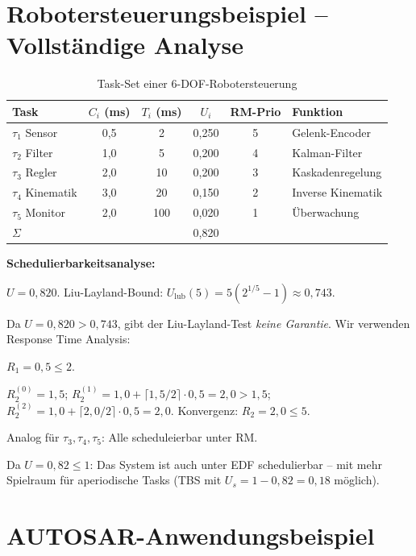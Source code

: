 ﻿\documentclass[a4paper,12pt]{report}
\theoremstyle{definition}
\begin{document}
\section{Robotersteuerungsbeispiel -- Vollständige Analyse}

\begin{table}[H]
	\centering
	\caption{Task-Set einer 6-DOF-Robotersteuerung}
	\begin{tabular}{lccccl}
		\toprule
		Task & $C_i$ (ms) & $T_i$ (ms) & $U_i$ & RM-Prio & Funktion \\
		\midrule
		$\tau_1$ Sensor     & 0{,}5  & 2    & 0{,}250 & 5 & Gelenk-Encoder \\
		$\tau_2$ Filter     & 1{,}0  & 5    & 0{,}200 & 4 & Kalman-Filter \\
		$\tau_3$ Regler     & 2{,}0  & 10   & 0{,}200 & 3 & Kaskadenregelung \\
		$\tau_4$ Kinematik  & 3{,}0  & 20   & 0{,}150 & 2 & Inverse Kinematik \\
		$\tau_5$ Monitor    & 2{,}0  & 100  & 0{,}020 & 1 & Überwachung \\
		\midrule
		$\Sigma$ & & & 0{,}820 & & \\
		\bottomrule
	\end{tabular}
\end{table}

\textbf{Schedulierbarkeitsanalyse:}

$U = 0{,}820$. Liu-Layland-Bound: $U_{\text{lub}}(5) = 5(2^{1/5}-1) \approx 0{,}743$.

Da $U = 0{,}820 > 0{,}743$, gibt der Liu-Layland-Test \emph{keine Garantie}.
Wir verwenden Response Time Analysis:

$R_1 = 0{,}5 \leq 2$. \checkmark

$R_2^{(0)} = 1{,}5$; $R_2^{(1)} = 1{,}0 + \lceil 1{,}5/2 \rceil \cdot 0{,}5 = 2{,}0 > 1{,}5$;
$R_2^{(2)} = 1{,}0 + \lceil 2{,}0/2 \rceil \cdot 0{,}5 = 2{,}0$. Konvergenz: $R_2 = 2{,}0 \leq 5$. \checkmark

Analog für $\tau_3, \tau_4, \tau_5$: Alle scheduleierbar unter RM.

Da $U = 0{,}82 \leq 1$: Das System ist auch unter EDF schedulierbar -- mit mehr
Spielraum für aperiodische Tasks (TBS mit $U_s = 1-0{,}82 = 0{,}18$ möglich).

\section{AUTOSAR-Anwendungsbeispiel}
\end{document}

